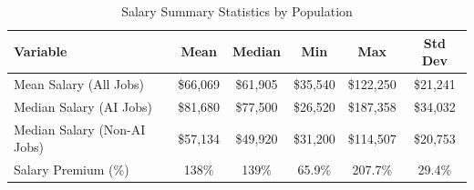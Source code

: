 \begin{table}[htbp]
\caption{Salary Summary Statistics by Population}
\label{tab:salary_summary}
\begin{tabular}{lccccc}
\hline\hline
Variable & Mean & Median & Min & Max & Std Dev \\
\hline
Mean Salary (All Jobs) & \$66,069 & \$61,905 & \$35,540 & \$122,250 & \$21,241 \\
Median Salary (AI Jobs) & \$81,680 & \$77,500 & \$26,520 & \$187,358 & \$34,032 \\
Median Salary (Non-AI Jobs) & \$57,134 & \$49,920 & \$31,200 & \$114,507 & \$20,753 \\
Salary Premium (\%) & 138\% & 139\% & 65.9\% & 207.7\% & 29.4\% \\
\hline\hline
\end{tabular}
\end{table}
